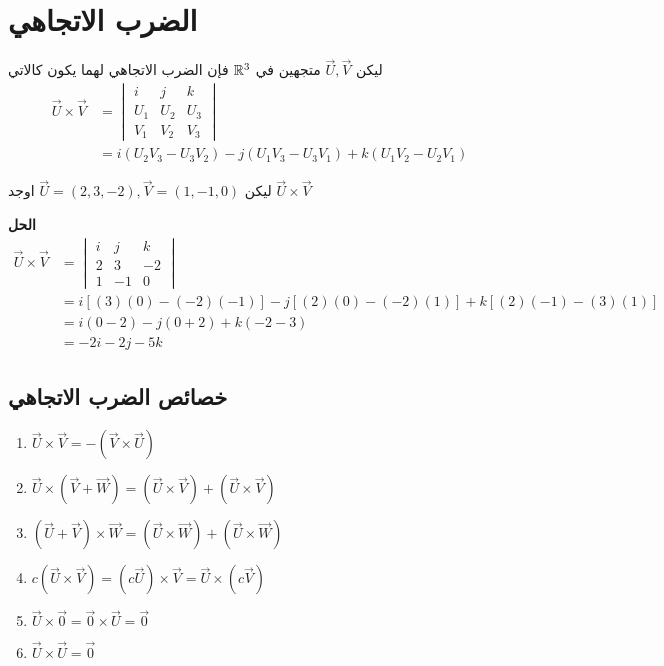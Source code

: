 \section{الضرب الاتجاهي}
ليكن $\vec{U}, \vec{V}$ متجهين في $\mathbb{R}^3$ فإن الضرب الاتجاهي لهما يكون كالاتي
\begin{align*}
	\vec{U}\times\vec{V} & = 
	\begin{vmatrix}
		i & j & k\\
		U_1 & U_2 & U_3\\
		V_1 & V_2 & V_3
	\end{vmatrix}\\
	&= i(U_2V_3 - U_3V_2 ) -j(U_1V_3 - U_3V_1) + k(U_1V_2 - U_2V_1)
\end{align*}
\begin{example}
	ليكن
	$\vec{U} = (2,3,-2), \vec{V} = (1,-1,0)$ 
	اوجد $\vec{U}\times\vec{V}$
\end{example}
\noindent
\textbf{الحل}
\begin{align*}
	\vec{U}\times\vec{V} & = 
	\begin{vmatrix}
		i & j & k\\
		2 & 3 & -2\\
		1 & -1 & 0
	\end{vmatrix}\\
	&= i[(3)(0) - (-2)(-1)] -j[(2)(0) - (-2)(1)] + k[(2)(-1) -(3)(1)]\\
	&= i(0-2) - j(0+2) + k(-2-3)\\
	&= -2i -2j -5k
\end{align*}

\subsection*{خصائص الضرب الاتجاهي}
\begin{english}
	\begin{enumerate}
		\item $\vec{U}\times\vec{V} = -(\vec{V}\times\vec{U})$
		\item $\vec{U}\times(\vec{V} + \vec{W}) = (\vec{U}\times\vec{V}) + (\vec{U}\times\vec{V})$
		\item $(\vec{U}+\vec{V})\times\vec{W} = (\vec{U}\times\vec{W}) + (\vec{U}\times\vec{W})$
		\item $c(\vec{U}\times\vec{V}) = (c\vec{U})\times\vec{V} = \vec{U}\times(c
		\vec{V})$
		\item $\vec{U}\times\vec{0} = \vec{0}\times\vec{U} = \vec{0}$
		\item $\vec{U}\times\vec{U} = \vec{0}$
	\end{enumerate}
\end{english}
\noindent
